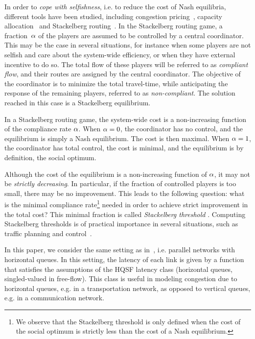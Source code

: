In order to \textit{cope with selfishness}, i.e. to reduce the cost of Nash equilibria, different tools have been studied, including congestion pricing~\cite{Ozdaglar2007}, capacity allocation~\cite{Korilis97capacityallocation} and Stackelberg routing~\cite{roughgarden2001stackelberg,aswani2011game,DBLP:conf/soda/Swamy07,Korilis97achievingnetwork}. In the Stackelberg routing game, a fraction~$\alpha$ of the players are assumed to be controlled by a central coordinator. This may be the case in several situations, for instance when some players are not selfish and care about the system-wide efficiency, or when they have external incentive to do so. The total flow of these players will be referred to as  \emph{compliant flow}, and their routes are assigned by the central coordinator. The objective of the coordinator is to minimize the total travel-time, while anticipating the response of the remaining players, referred to as \emph{non-compliant}. The solution reached in this case is a Stackelberg equilibrium.

In a Stackelberg routing game, the system-wide cost is a non-increasing function of the compliance rate $\alpha$. When $\alpha = 0$, the coordinator has no control, and the equilibrium is simply a Nash equilibrium. The cost is then maximal. When $\alpha = 1$, the coordinator has total control, the cost is minimal, and the equilibrium is by definition, the social optimum.

Although the cost of the equilibrium is a non-increasing function of $\alpha$, it may not be \emph{strictly decreasing}. In particular, if the fraction of controlled players is too small, there may be no improvement. This leads to the following question: what is the minimal compliance rate\footnote{We observe that the Stackelberg threshold is only defined when the cost of the social optimum is strictly less than the cost of a Nash equilibrium.} needed in order to achieve strict improvement in the total cost? This minimal fraction is called \textit{Stackelberg threshold} \cite{Sharma07stackelbergthresholds}. Computing Stackelberg thresholds is of practical importance in several situations, such as traffic planning and control~\cite{krichene12}.


In this paper, we consider the same setting as in~\cite{krichene12}, i.e. parallel networks with horizontal queues. In this setting, the latency of each link is given by a function that satisfies the assumptions of the HQSF  latency class (horizontal queues, singled-valued in free-flow). This class is useful in modeling congestion due to horizontal queues, e.g. in a transportation network, as opposed to vertical queues, e.g. in a communication network.

